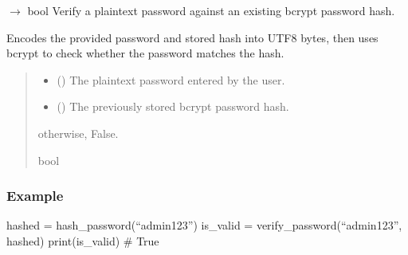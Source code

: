 \documentclass[letterpaper,10pt,english]{sphinxmanual}
\begin{document}
\begin{fulllineitems}
\label{\detokenize{modules:app.security.verify_password}}
\pysigstartsignatures
\pysiglinewithargsret
{}
{\sphinxparamcomma {}}
{{ $\rightarrow$ bool}}
\pysigstopsignatures
\sphinxAtStartPar
Verify a plain\sphinxhyphen{}text password against an existing bcrypt password hash.

\sphinxAtStartPar
Encodes the provided password and stored hash into UTF\sphinxhyphen{}8 bytes,
then uses bcrypt to check whether the password matches the hash.
\begin{quote}\begin{description}
\begin{itemize}
\item {} 
\sphinxAtStartPar
{} () \textendash{} The plain\sphinxhyphen{}text password entered by the user.

\item {} 
\sphinxAtStartPar
{} () \textendash{} The previously stored bcrypt password hash.

\end{itemize}

\sphinxAtStartPar
\begin{description}
\sphinxAtStartPar
otherwise, False.

\end{description}


\sphinxAtStartPar
bool

\end{description}\end{quote}
\subsubsection*{Example}

\sphinxAtStartPar
hashed = hash\_password(“admin123”)
is\_valid = verify\_password(“admin123”, hashed)
print(is\_valid)  \# True

\end{fulllineitems}
\end{document}
